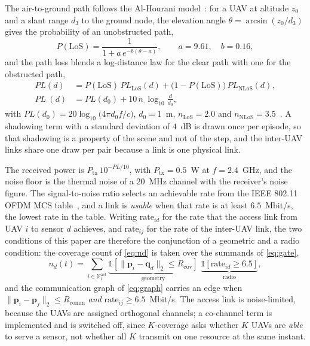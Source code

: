 \documentclass[conference]{IEEEtran}
\begin{document}
The air-to-ground path follows the Al-Hourani model~\cite{alhourani2014}: for a UAV at altitude $z_0$ and a slant range $d_3$ to the ground node, the elevation angle $\theta=\arcsin(z_0/d_3)$ gives the probability of an unobstructed path,
\begin{equation}
P(\mathrm{LoS})=\frac{1}{1+a\,e^{-b(\theta-a)}},\qquad a=9.61,\quad b=0.16,
\label{eq:los}
\end{equation}
and the path loss blends a log-distance law for the clear path with one for the obstructed path,
\begin{equation}
\begin{split}
PL(d)&=P(\mathrm{LoS})\,PL_{\mathrm{LoS}}(d)+\bigl(1-P(\mathrm{LoS})\bigr)\,PL_{\mathrm{NLoS}}(d),\\
PL_{\cdot}(d)&=PL(d_0)+10\,n_{\cdot}\log_{10}\frac{d}{d_0},
\end{split}
\label{eq:pl}
\end{equation}
with $PL(d_0)=20\log_{10}\!\bigl(4\pi d_0 f/c\bigr)$, $d_0=1$~m, $n_{\mathrm{LoS}}=2.0$ and $n_{\mathrm{NLoS}}=3.5$~\cite{3gpp36777}. A shadowing term with a standard deviation of $4$~dB is drawn once per episode, so that shadowing is a property of the scene and not of the step, and the inter-UAV links share one draw per pair because a link is one physical link.

The received power is $P_{\mathrm{tx}}\,10^{-PL/10}$, with $P_{\mathrm{tx}}=0.5$~W at $f=2.4$~GHz, and the noise floor is the thermal noise of a $20$~MHz channel with the receiver's noise figure. The signal-to-noise ratio selects an achievable rate from the IEEE 802.11 OFDM MCS table~\cite{ieee80211}, and a link is \emph{usable} when that rate is at least $6.5$~Mbit/s, the lowest rate in the table. Writing $\mathrm{rate}_{id}$ for the rate that the access link from UAV $i$ to sensor $d$ achieves, and $\mathrm{rate}_{ij}$ for the rate of the inter-UAV link, the two conditions of this paper are therefore the conjunction of a geometric and a radio condition: the coverage count of \eqref{eq:nd} is taken over the summands of \eqref{eq:gate},
\begin{equation}
n_d(t)=\sum_{i\in\mathcal V_t^{\mathrm{act}}}
\underbrace{\mathbb 1\!\left[\|\mathbf p_i-\mathbf q_d\|_2\le R_{\mathrm{cov}}\right]}_{\text{geometry}}
\;\underbrace{\mathbb 1\!\left[\mathrm{rate}_{id}\ge 6.5\right]}_{\text{radio}},
\label{eq:gate}
\end{equation}
and the communication graph of \eqref{eq:graph} carries an edge when $\|\mathbf p_i-\mathbf p_j\|_2\le R_{\mathrm{comm}}$ \emph{and} $\mathrm{rate}_{ij}\ge 6.5$~Mbit/s.
The access link is noise-limited, because the UAVs are assigned orthogonal channels; a co-channel term is implemented and is switched off, since $K$-coverage asks whether $K$ UAVs are \emph{able} to serve a sensor, not whether all $K$ transmit on one resource at the same instant.
\end{document}
